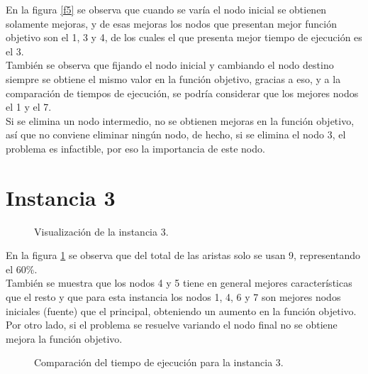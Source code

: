 \documentclass[12pt]{article}
\begin{document}
En la figura \ref{f5} se observa que cuando se varía el nodo inicial se obtienen solamente mejoras, y de esas mejoras los nodos que presentan mejor función objetivo son el 1, 3 y 4, de los cuales el que presenta mejor tiempo de ejecución es el 3. \\

También se observa que fijando el nodo inicial y cambiando el nodo destino siempre se obtiene el mismo valor en la función objetivo, gracias a eso, y a la comparación de tiempos de ejecución, se podría considerar que los mejores nodos el 1 y el 7. \\

Si se elimina un nodo intermedio, no se obtienen mejoras en la función objetivo, así que no conviene eliminar ningún nodo, de hecho, si se elimina el nodo 3, el problema es infactible, por eso la importancia de este nodo. 

\newpage
\section*{Instancia 3}

\begin{figure}[H]
\centering
{}

\caption{Visualización de la instancia 3.} \label{f6}
\end{figure}

En la figura \ref{f6} se observa que del total de las aristas solo se usan 9, representando el 60\%. \\

También se muestra que los nodos 4 y 5 tiene en general mejores características que el resto y que para esta instancia los nodos 1, 4, 6 y 7 son mejores nodos iniciales (fuente) que el principal, obteniendo un aumento en la función objetivo. \\

Por otro lado, si el problema se resuelve variando el nodo final no se obtiene mejora la función objetivo.

\newpage

\begin{figure}[H]
\centering
{}

\caption{Comparación del tiempo de ejecución para la instancia 3.} \label{f7}
\end{figure}
\end{document}
